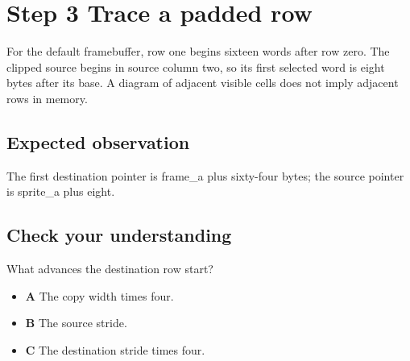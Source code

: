 \section{Step 3 Trace a padded row}\label{blit-s03}

For the default framebuffer, row one begins sixteen words after row zero. The clipped source begins in source column two, so its first selected word is eight bytes after its base. A diagram of adjacent visible cells does not imply adjacent rows in memory.


\subsection{Expected observation}
The first destination pointer is frame\_a plus sixty-four bytes; the source pointer is sprite\_a plus eight.

\subsection{Check your understanding}
What advances the destination row start?

\begin{itemize}
  \item \textbf{A} The copy width times four.
  \item \textbf{B} The source stride.
  \item \textbf{C} The destination stride times four.
\end{itemize}
